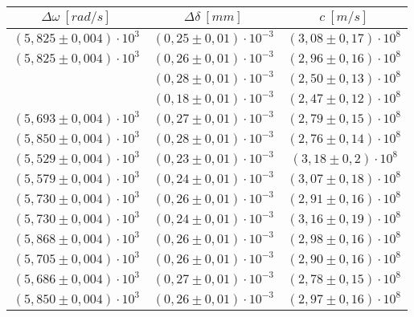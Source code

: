 \begin{table}[H]
    \centering
        \begin{tabular}{|c|c|c|}
        \hline
        $ \Delta\omega~[rad/s] $ & $ \Delta\delta~[mm] $ & $ c~[m/s] $\\
        \hline
        $ (5,825 \pm 0,004) \cdot 10^{3} $ & $ (0,25 \pm 0,01) \cdot 10^{-3} $ & $ (3,08 \pm 0,17) \cdot 10^{8} $\\
        \hline
        $ (5,825 \pm 0,004) \cdot 10^{3} $ & $ (0,26 \pm 0,01) \cdot 10^{-3} $ & $ (2,96 \pm 0,16) \cdot 10^{8} $\\
        \hline
        \textcolor{red}{$ (5,265 \pm 0,004) \cdot 10^{3} $ & $ (0,28 \pm 0,01) \cdot 10^{-3} $ & $ (2,50 \pm 0,13) \cdot 10^{8} $}\\
        \hline
        \textcolor{red}{$ (5,228 \pm 0,004) \cdot 10^{3} $ & $ (0,18 \pm 0,01) \cdot 10^{-3} $ & $ (2,47 \pm 0,12) \cdot 10^{8} $}\\
        \hline
        $ (5,693 \pm 0,004) \cdot 10^{3} $ & $ (0,27 \pm 0,01) \cdot 10^{-3} $ & $ (2,79 \pm 0,15) \cdot 10^{8} $\\
        \hline
        $ (5,850 \pm 0,004) \cdot 10^{3} $ & $ (0,28 \pm 0,01) \cdot 10^{-3} $ & $ (2,76 \pm 0,14) \cdot 10^{8} $\\
        \hline
        $ (5,529 \pm 0,004) \cdot 10^{3} $ & $ (0,23 \pm 0,01) \cdot 10^{-3} $ & $ (3,18 \pm 0,2) \cdot 10^{8} $\\
        \hline
        $ (5,579 \pm 0,004) \cdot 10^{3} $ & $ (0,24 \pm 0,01) \cdot 10^{-3} $ & $ (3,07 \pm 0,18) \cdot 10^{8} $\\
        \hline
        $ (5,730 \pm 0,004) \cdot 10^{3} $ & $ (0,26 \pm 0,01) \cdot 10^{-3} $ & $ (2,91 \pm 0,16) \cdot 10^{8} $\\
        \hline
        $ (5,730 \pm 0,004) \cdot 10^{3} $ & $ (0,24 \pm 0,01) \cdot 10^{-3} $ & $ (3,16 \pm 0,19) \cdot 10^{8} $\\
        \hline
        $ (5,868 \pm 0,004) \cdot 10^{3} $ & $ (0,26 \pm 0,01) \cdot 10^{-3} $ & $ (2,98 \pm 0,16) \cdot 10^{8} $\\
        \hline
        $ (5,705 \pm 0,004) \cdot 10^{3} $ & $ (0,26 \pm 0,01) \cdot 10^{-3} $ & $ (2,90 \pm 0,16) \cdot 10^{8} $\\
        \hline
        $ (5,686 \pm 0,004) \cdot 10^{3} $ & $ (0,27 \pm 0,01) \cdot 10^{-3} $ & $ (2,78 \pm 0,15) \cdot 10^{8} $\\
        \hline
        $ (5,850 \pm 0,004) \cdot 10^{3} $ & $ (0,26 \pm 0,01) \cdot 10^{-3} $ & $ (2,97 \pm 0,16) \cdot 10^{8} $\\

\end{tabular}
\end{table}
